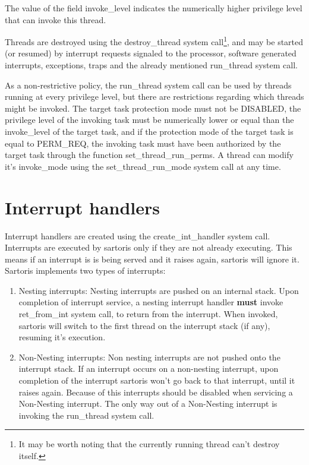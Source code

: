 \documentclass[11pt, letterpaper, twoside, english]{book}
\begin{document}
The value of the field \textsf{invoke\_level} indicates the numerically higher privilege level that can invoke this thread. 

Threads are destroyed using the \textsf{destroy\_thread} system call\footnote{It may be worth noting that the currently running thread can't destroy itself.}, and may be started (or resumed) by interrupt requests signaled to the processor, software generated interrupts, exceptions, traps and the already mentioned \textsf{run\_thread} system call.

As a non-restrictive policy, the \textsf{run\_thread} system call can be used by threads running at every privilege level, but there are restrictions regarding which threads might be invoked. The target task protection mode must not be \textsf{DISABLED}, the privilege level of the invoking task must be numerically lower or equal than the \textsf{invoke\_level} of the target task, and if the protection mode of the target task is equal to \textsf{PERM\_REQ}, the invoking task must have been authorized by the target task through the function \textsf{set\_thread\_run\_perms}.
A thread can modify it's \textsf{invoke\_mode} using the \textsf{set\_thread\_run\_mode} system call at any time. 
       
\section{Interrupt handlers}
Interrupt handlers are created using the \textsf{create\_int\_handler} system call. Interrupts are executed by sartoris only if they are not already executing. This means if an interrupt is is being served and it raises again, sartoris will ignore it.\\

Sartoris implements two types of interrupts:

\begin{enumerate}
\item[]\textsf{Nesting interrupts}: Nesting interrupts are pushed on an internal stack. Upon completion of interrupt service, a \textsf{nesting} interrupt handler \textbf{must} invoke \textsf{ret\_from\_int} system call, to return from the interrupt. When invoked, sartoris will switch to the first thread on the interrupt stack (if any), resuming it's execution.
\item[]\textsf{Non-Nesting interrupts}: Non nesting interrupts are not pushed onto the interrupt stack. If an interrupt occurs on a non-nesting interrupt, upon completion of the interrupt sartoris won't go back to that interrupt, until it raises again. Because of this interrupts should be disabled when servicing a Non-Nesting interrupt.
The only way out of a Non-Nesting interrupt is invoking the \textsf{run\_thread} system call.
\end{enumerate} 
\end{document}
